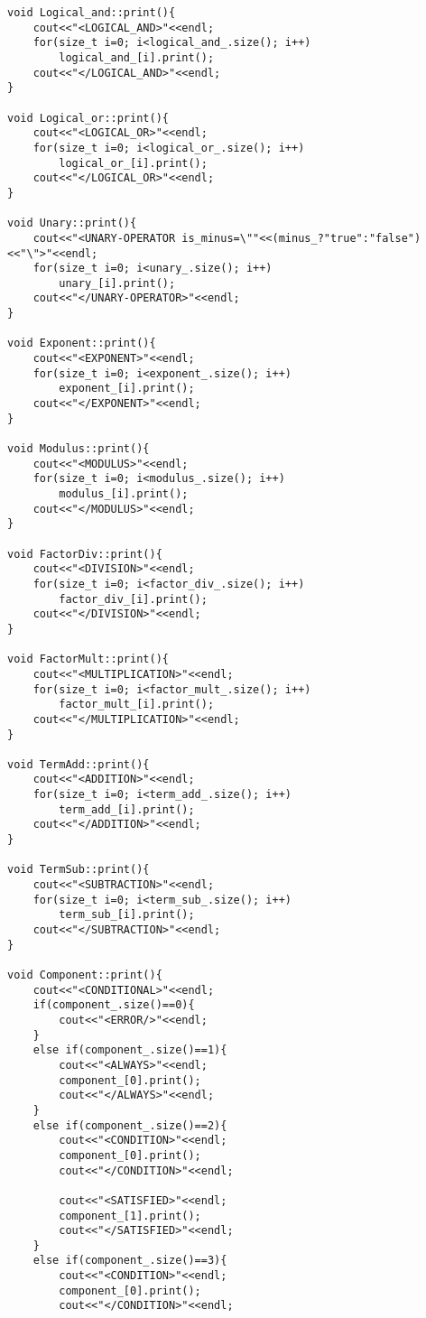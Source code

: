 \documentclass[pdftex,12pt,letterpaper,notitlepage,twoside]{article}
\begin{document}
\begin{lstlisting}[frame=single,caption={C program for testing}]
void Logical_and::print(){
    cout<<"<LOGICAL_AND>"<<endl;
    for(size_t i=0; i<logical_and_.size(); i++)
        logical_and_[i].print();
    cout<<"</LOGICAL_AND>"<<endl;
}

void Logical_or::print(){
    cout<<"<LOGICAL_OR>"<<endl;
    for(size_t i=0; i<logical_or_.size(); i++)
        logical_or_[i].print();
    cout<<"</LOGICAL_OR>"<<endl;
}

void Unary::print(){
    cout<<"<UNARY-OPERATOR is_minus=\""<<(minus_?"true":"false")<<"\">"<<endl;
    for(size_t i=0; i<unary_.size(); i++)
        unary_[i].print();
    cout<<"</UNARY-OPERATOR>"<<endl;
}

void Exponent::print(){
    cout<<"<EXPONENT>"<<endl;
    for(size_t i=0; i<exponent_.size(); i++)
        exponent_[i].print();
    cout<<"</EXPONENT>"<<endl;
}

void Modulus::print(){
    cout<<"<MODULUS>"<<endl;
    for(size_t i=0; i<modulus_.size(); i++)
        modulus_[i].print();
    cout<<"</MODULUS>"<<endl;
}

void FactorDiv::print(){
    cout<<"<DIVISION>"<<endl;
    for(size_t i=0; i<factor_div_.size(); i++)
        factor_div_[i].print();
    cout<<"</DIVISION>"<<endl;
}

void FactorMult::print(){
    cout<<"<MULTIPLICATION>"<<endl;
    for(size_t i=0; i<factor_mult_.size(); i++)
        factor_mult_[i].print();
    cout<<"</MULTIPLICATION>"<<endl;
}

void TermAdd::print(){
    cout<<"<ADDITION>"<<endl;
    for(size_t i=0; i<term_add_.size(); i++)
        term_add_[i].print();
    cout<<"</ADDITION>"<<endl;
}

void TermSub::print(){
    cout<<"<SUBTRACTION>"<<endl;
    for(size_t i=0; i<term_sub_.size(); i++)
        term_sub_[i].print();
    cout<<"</SUBTRACTION>"<<endl;
}

void Component::print(){
    cout<<"<CONDITIONAL>"<<endl;
    if(component_.size()==0){
        cout<<"<ERROR/>"<<endl;
    }
    else if(component_.size()==1){
        cout<<"<ALWAYS>"<<endl;
        component_[0].print();
        cout<<"</ALWAYS>"<<endl;
    }
    else if(component_.size()==2){  
        cout<<"<CONDITION>"<<endl;
        component_[0].print();
        cout<<"</CONDITION>"<<endl;
        
        cout<<"<SATISFIED>"<<endl;
        component_[1].print();
        cout<<"</SATISFIED>"<<endl;
    }
    else if(component_.size()==3){  
        cout<<"<CONDITION>"<<endl;
        component_[0].print();
        cout<<"</CONDITION>"<<endl;
        

\end{lstlisting}
\end{document}
